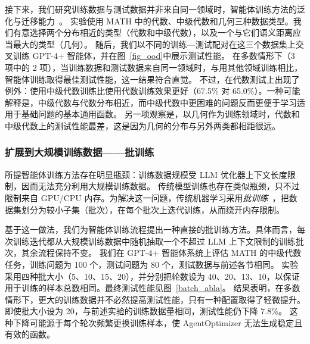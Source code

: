\documentclass{article}
\begin{document}
接下来，我们研究训练数据与测试数据并非来自同一领域时，智能体训练方法的泛化与迁移能力~\cite{zhou2022domain}。
实验使用 MATH 中的代数、中级代数和几何三种数据类型。我们有意选择两个分布相近的类型（代数和中级代数），以及一个与它们语义距离应当最大的类型（几何）。
随后，我们以不同的训练—测试配对在这三个数据集上交叉训练 GPT-4+ 智能体，并在图~\ref{fig_ood}中展示测试性能。
在多数情形下（3 项中的 2 项），当训练数据和测试数据来自同一领域时，与用其他领域训练相比，智能体训练取得最佳测试性能，这一结果符合直觉。
不过，在代数测试上出现了例外：使用中级代数训练比使用代数训练效果更好（67.5\% 对 65.0\%）。一种可能解释是，中级代数与代数分布相近，而中级代数中更困难的问题反而更便于学习适用于基础问题的基本通用函数。
另一项观察是，以几何作为训练领域时，代数和中级代数上的测试性能最差，这是因为几何的分布与另外两类都相距很远。

\subsubsection{扩展到大规模训练数据——批训练}
\label{sec:batch_train}

所提智能体训练方法存在明显瓶颈：训练数据规模受 LLM 优化器上下文长度限制，因而无法充分利用大规模训练数据。
传统模型训练也存在类似瓶颈，只不过限制来自 GPU/CPU 内存。为解决这一问题，传统机器学习采用\emph{批训练}~\cite{masters2018revisiting}，把数据集划分为较小子集（批次），在每个批次上迭代训练，从而绕开内存限制。

基于这一做法，我们为智能体训练流程提出一种直接的批训练方法。具体而言，每次训练迭代都从大规模训练数据中随机抽取一个不超过 LLM 上下文限制的训练批次，其余流程保持不变。
我们在 GPT-4+ 智能体系统上评估 MATH 的中级代数任务，训练问题为 100 个，测试问题为 80 个，测试数据与前述各节相同。
实验采用四种批大小（5、10、15、20），并分别把轮数设为 40、20、13、10，以保证用于训练的样本总数相同。最终测试性能见图~\ref{batch_abla}。
结果表明，在多数情形下，更大的训练数据并不必然提高测试性能，只有一种配置取得了轻微提升。即使批大小设为 20，与前述实验的训练数据量相同，测试性能仍下降 7.8\%。
这种下降可能源于每个轮次频繁更换训练样本，使 AgentOptimizer 无法生成稳定且有效的函数。
\end{document}
